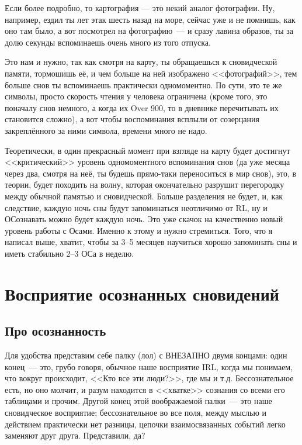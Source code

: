 \documentclass[a5paper,12pt,twoside]{memoir}
\begin{document}
Если более подробно, то картография — это некий аналог фотографии. Ну, например, ездил ты лет этак шесть назад на море, сейчас уже и не помнишь, как оно там было, а вот посмотрел на фотографию~--- и сразу лавина образов, ты за долю секунды вспоминаешь очень много из того отпуска.
 
Это нам и нужно, так как смотря на карту, ты обращаешься к сновидческой памяти, тормошишь её, и чем больше на ней изображено <<фотографий>>, тем больше снов ты вспоминаешь практически одномоментно. По сути, это те же символы, просто скорость чтения у человека ограничена (кроме того, это поначалу снов немного, а когда их Over 900, то в дневнике перечитывать их становится сложно), а вот чтобы воспоминания всплыли от созерцания закреплённого за ними символа, времени много не надо. 

Теоретически, в один прекрасный момент при взгляде на карту будет достигнут <<критический>> уровень одномоментного вспоминания снов  (да уже месяца через два, смотря на неё, ты будешь прямо-таки переноситься в мир снов), это, в теории, будет походить на волну, которая окончательно разрушит перегородку между обычной памятью и сновидческой. Больше разделения не будет, и, как следствие, каждую ночь сны будут запоминаться неотличимо от RL, ну и ОСознавать можно будет каждую ночь. Это уже скачок на качественно новый уровень работы с Осами. Именно к этому и нужно стремиться. 
Того, что я написал выше, хватит, чтобы за 3--5 месяцев научиться хорошо запоминать сны и иметь стабильно 2--3 ОСа в неделю.





\chapter{Восприятие осознанных сновидений}


\section{Про осознанность}
Для удобства представим себе палку (лол) с ВНЕЗАПНО двумя концами: один конец~--- это, грубо говоря, обычное наше восприятие IRL, когда мы понимаем, что вокруг происходит, <<Кто все эти люди?>>, где мы и т.д. Бессознательное есть, но оно молчит, и разум находится в <<хватке>> сознания со всеми его таблицами и прочим. Другой конец этой воображаемой палки~--- это наше сновидческое восприятие; бессознательное во все поля, между мыслью и действием практически нет разницы, цепочки взаимосвязанных событий легко заменяют друг друга. Представили, да?
 
\end{document}
